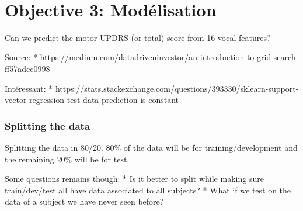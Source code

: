 \documentclass[11pt]{article}
\begin{document}
    \begin{center}
    \end{center}
    { \hspace*{\fill} \\}
    
    \section{Objective 3: Modélisation}\label{objective-3-moduxe9lisation}

    Can we predict the motor UPDRS (or total) score from 16 vocal features?

    Source: *
https://medium.com/datadriveninvestor/an-introduction-to-grid-search-ff57adcc0998

Intéressant: *
https://stats.stackexchange.com/questions/393330/sklearn-support-vector-regression-test-data-prediction-is-constant

    \subsubsection{Splitting the data}\label{splitting-the-data}

Splitting the data in 80/20. 80\% of the data will be for
training/development and the remaining 20\% will be for test.

Some questions remains though: * Is it better to split while making sure
train/dev/test all have data associated to all subjects? * What if we
test on the data of a subject we have never seen before?
\end{document}
